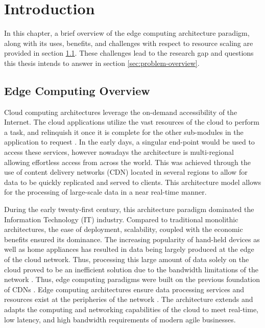 \clearpage

\def\chaptertitle{Introduction}

\lhead{\emph{\chaptertitle}}

\chapter{\chaptertitle}
\label{ch:introduction}


In this chapter, a brief overview of the edge computing architecture paradigm, along with its uses, benefits, and challenges with respect to resource scaling are provided in section \ref{sec:edge-arch}. These challenges lead to the research gap and questions this thesis intends to answer in section \ref{sec:problem-overview}.\par

\section{Edge Computing Overview}
\label{sec:edge-arch}

Cloud computing architectures leverage the on-demand accessibility of the Internet. The cloud applications utilize the vast resources of the cloud to perform a task, and relinquish it once it is complete for the other sub-modules in the application to request \cite{rimal2009taxonomy}. In the early days, a singular end-point would be used to access these services, however nowadays the architecture is multi-regional allowing effortless access from across the world. This was achieved through the use of content delivery networks (CDN) located in several regions to allow for data to be quickly replicated and served to clients. This architecture model allows for the processing of large-scale data in a near real-time manner.\par

During the early twenty-first century, this architecture paradigm dominated the Information Technology (IT) industry. Compared to traditional monolithic architectures, the ease of deployment, scalability, coupled with the economic benefits ensured its dominance. The increasing popularity of hand-held devices as well as home appliances has resulted in data being largely produced at the edge of the cloud network. Thus, processing this large amount of data solely on the cloud proved to be an inefficient solution due to the bandwidth limitations of the network \cite{shi2016edge}. Thus, edge computing paradigms were built on the previous foundation of CDNs \cite{satyanarayanan2017emergence}. Edge computing architectures ensure data processing services and resources exist at the peripheries of the network \cite{cao2020overview}. The architecture extends and adapts the computing and networking capabilities of the cloud to meet real-time, low latency, and high bandwidth requirements of modern agile businesses.\par

